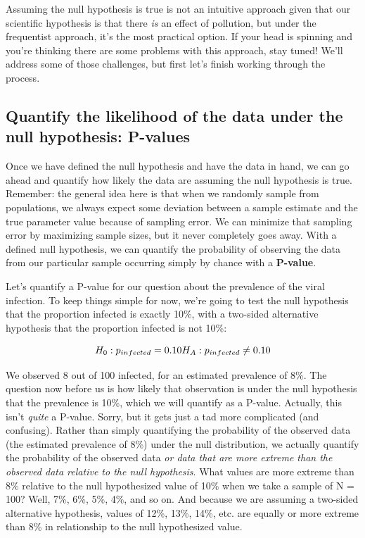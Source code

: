 \documentclass[
]{book}
\begin{document}
Assuming the null hypothesis is true is not an intuitive approach given that our scientific hypothesis is that there \emph{is} an effect of pollution, but under the frequentist approach, it's the most practical option. If your head is spinning and you're thinking there are some problems with this approach, stay tuned! We'll address some of those challenges, but first let's finish working through the process.

\subsection{Quantify the likelihood of the data under the null hypothesis: P-values}\label{quantify-the-likelihood-of-the-data-under-the-null-hypothesis-p-values}

Once we have defined the null hypothesis and have the data in hand, we can go ahead and quantify how likely the data are assuming the null hypothesis is true. Remember: the general idea here is that when we randomly sample from populations, we always expect some deviation between a sample estimate and the true parameter value because of sampling error. We can minimize that sampling error by maximizing sample sizes, but it never completely goes away. With a defined null hypothesis, we can quantify the probability of observing the data from our particular sample occurring simply by chance with a \textbf{P-value}.

Let's quantify a P-value for our question about the prevalence of the viral infection. To keep things simple for now, we're going to test the null hypothesis that the proportion infected is exactly 10\%, with a two-sided alternative hypothesis that the proportion infected is not 10\%:

\[
H_0: p_{infected}=0.10 \\
H_A: p_{infected}\neq0.10
\]

We observed 8 out of 100 infected, for an estimated prevalence of 8\%. The question now before us is how likely that observation is under the null hypothesis that the prevalence is 10\%, which we will quantify as a P-value. Actually, this isn't \emph{quite} a P-value. Sorry, but it gets just a tad more complicated (and confusing). Rather than simply quantifying the probability of the observed data (the estimated prevalence of 8\%) under the null distribution, we actually quantify the probability of the observed data \emph{or data that are more extreme than the observed data relative to the null hypothesis}. What values are more extreme than 8\% relative to the null hypothesized value of 10\% when we take a sample of N = 100? Well, 7\%, 6\%, 5\%, 4\%, and so on. And because we are assuming a two-sided alternative hypothesis, values of 12\%, 13\%, 14\%, etc. are equally or more extreme than 8\% in relationship to the null hypothesized value.
\end{document}

